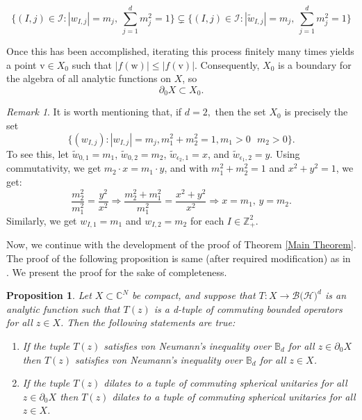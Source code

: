 \documentclass[12pt,reqno] {amsart}
\newtheorem{proposition}{Proposition}
\theoremstyle{remark}
\newtheorem{remark}[theorem]{Remark}%
\theoremstyle{definition}
\begin{document}
\[\Big\{
(I, j) \in \mathcal{I} :
 |w_{I,j}| = m_j,\ 
\sum_{j=1}^d  m_j^2 = 1
\Big\} 
\subsetneq 
\Big\{
(I, j) \in \mathcal{I} :
 |\tilde{w}_{I,j}| = m_j,\
\sum_{j=1}^d m_j^2 = 1
\Big\}\]

Once this has been accomplished, iterating this process finitely many times
yields a point \( \mathrm{v} \in X_0 \) such that \( |f(\mathrm{w})| \leq |f(\mathrm{v})| \).
Consequently, \( X_0 \) is a boundary for the algebra of all analytic functions on \( X \), so
\[
\partial_0 X \subset X_0.
\]

\begin{remark}
    It is worth mentioning that, if $d=2,$ then the set $X_0$ is precisely the set
    \[\big\{(w_{I,j}): |w_{I,j}|=m_j, m_1^2+m_2^2=1, m_1>0 \mbox{ }m_2>0\big\}.\]
To see this, let \( \tilde{w}_{0,1} = m_1 \), \( \tilde{w}_{0,2} = m_2 \), \( \tilde{w}_{\epsilon_2,1} = x \), and \( \tilde{w}_{\epsilon_1,2} = y \). Using commutativity, we get \( m_2 \cdot x = m_1 \cdot y \), and with \( m_1^2 + m_2^2 = 1 \) and \(x^2+y^2 =1\), we get:
\[
\frac{m_2^2}{m_1^2} = \frac{y^2}{x^2} \Rightarrow \frac{m_2^2 + m_1^2}{m_1^2} = \frac{x^2 + y^2}{x^2} \Rightarrow x = m_1, \, y = m_2.\]    
Similarly, we get $w_{I,1}=m_1$ and $w_{I,2}=m_2$ for each $I\in\mathbb Z_+^2.$    
\end{remark}
Now, we continue with the development of the proof of  Theorem \ref{Main Theorem}. The proof of the following proposition is same (after required modification) as in \cite[Proposition 2.1]{Hz}. We present the proof for the sake of completeness.
\begin{proposition}\label{Arveson}
    Let \(X \subset\mathbb{C}^N  \) be compact, and suppose that \(T: X\to \mathcal{B}(\mathcal{H)}^d\) is an analytic function such that \(T(z)\) is a d-tuple of commuting bounded operators  for all \(z\in X\). Then the following statements are true: 
    \begin{enumerate}
        \item If the tuple \(T(z)\) satisfies  von Neumann's inequality over $\mathbb B_d$ for all \(z\in \partial_0 X\) then $T(z)$ satisfies von Neumann's inequality over $\mathbb B_d$ for all $z\in  X$.
        \item If the tuple \(T(z)\) dilates to a tuple of commuting spherical unitaries for all \(z\in \partial_0 X\) then $T(z)$ dilates to a tuple of commuting spherical unitaries for all $z\in X$.
    \end{enumerate}
\end{proposition}
\end{document}
